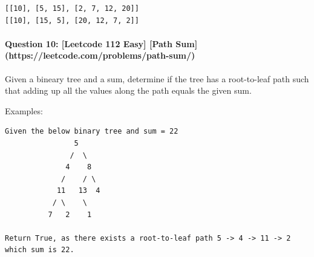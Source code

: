 \documentclass[11pt]{article}
\begin{document}
    \begin{Verbatim}[commandchars=\\\{\}]
[[10], [5, 15], [2, 7, 12, 20]]
[[10], [15, 5], [20, 12, 7, 2]]

    \end{Verbatim}

    \paragraph{Question 10: {[}Leetcode 112 Easy{]} {[}Path
Sum{]}(https://leetcode.com/problems/path-sum/)}\label{question-10-leetcode-112-easy-path-sumhttpsleetcode.comproblemspath-sum}

Given a bineary tree and a sum, determine if the tree has a root-to-leaf
path such that adding up all the values along the path equals the given
sum.

Examples:

\begin{verbatim}
Given the below binary tree and sum = 22
                5
               /  \
              4    8
             /    / \
            11   13  4 
           / \    \
          7   2    1
          
Return True, as there exists a root-to-leaf path 5 -> 4 -> 11 -> 2 which sum is 22.
\end{verbatim}
\end{document}
